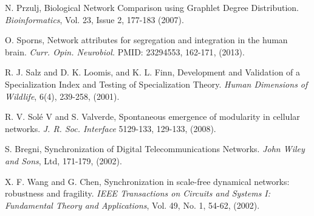 \documentclass[12pt]{thesis}
\begin{document}
\begin{thebibliography}{99}
     N. Przulj, Biological Network Comparison using Graphlet Degree Distribution. \textit{Bioinformatics}, Vol. 23, Issue 2, {177-183} (2007).

     O. Sporns, Network attributes for segregation and integration in the human brain. \textit{Curr. Opin. Neurobiol.} PMID: 23294553, {162-171}, (2013).

     R. J. Salz and D. K. Loomis, and K. L. Finn, Development and Validation of a Specialization Index and Testing of Specialization Theory. \textit{Human Dimensions of Wildlife}, 6(4), 239-258, (2001).

     R. V. Solé V and S. Valverde, Spontaneous emergence of modularity in cellular networks. \textit{J. R. Soc. Interface} 5129-133, {129-133}, (2008).

     S. Bregni, Synchronization of Digital Telecommunications Networks. \textit{John Wiley and Sons}, Ltd, {171-179}, (2002).

     X. F. Wang and G. Chen, Synchronization in scale-free dynamical networks: robustness and fragility. \textit{IEEE Transactions on Circuits and Systems I: Fundamental Theory and Applications}, Vol. 49, No. 1, {54-62}, (2002).
\end{thebibliography}

\end{document}
